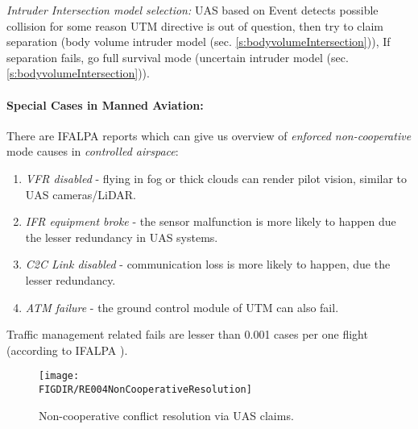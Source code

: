 \begin{note}
    \emph{Intruder Intersection model selection:} UAS based on Event detects possible collision for some reason UTM directive is out of question, then try to claim separation (body volume intruder model (sec. \ref{s:bodyvolumeIntersection})), If separation fails, go full survival mode (uncertain intruder model (sec. \ref{s:bodyvolumeIntersection})).
\end{note}

\newpage \paragraph{Special Cases in Manned Aviation:} There are IFALPA reports which can give us overview of \emph{enforced non-cooperative} mode causes in \emph{controlled airspace}:  
\begin{enumerate}
    \item \emph{VFR disabled} - flying in fog or thick clouds can render pilot vision, similar to UAS cameras/LiDAR.
    
    \item \emph{IFR equipment broke} - the sensor malfunction is more likely to happen due the lesser redundancy in UAS systems.
    
    \item \emph{C2C Link disabled} - communication loss is more likely to happen, due the lesser redundancy.
    
    \item \emph{ATM failure} - the ground control module of UTM can also fail.
\end{enumerate}

\begin{note}
    Traffic management related fails are lesser than 0.001 cases per one flight (according to IFALPA \cite{subotic2007recovery}).
\end{note}

\begin{figure}[H]
    \centering
    \texttt{[image: \\FIGDIR/RE004NonCooperativeResolution]} 
    \caption{Non-cooperative conflict resolution via UAS claims.}
    \label{fig:NonCooperativeConflictResolutionUTM}
\end{figure}

